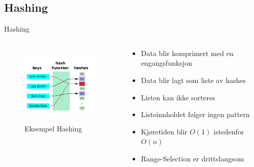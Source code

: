 \subsection*{Hashing}
\begin{frame}{Hashing}
    \begin{columns}
    \begin{column}{0.48\textwidth}
    \begin{figure}
        \includegraphics[height = 3.8cm]{images/hashing.png}
        \caption{Eksempel Hashing}
        \label{fig:hashing}
    \end{figure}
    \end{column}
    \begin{column}{0.48\textwidth}
    \begin{itemize}[<+->]
        \item Data blir komprimert med en engangsfunksjon
        \item Data blir lagt som liste av hashes
        \item Listen kan ikke sorteres
        \item Listeinnholdet følger ingen pattern
        \item Kjøretiden blir $O(1)$ istedenfor $O(n)$
        \item Range-Selection er drittslangsom
    \end{itemize}
    \end{column}
    \end{columns}
\end{frame}

